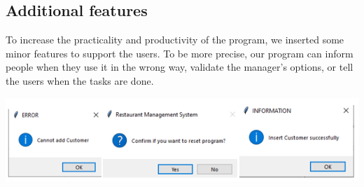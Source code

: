 \subsection{Additional features}
\hspace{0.7cm} To increase the practicality and productivity of the program, we inserted some minor features to support the users. To be more precise, our program can inform people when they use it in the wrong way, validate the manager’s options, or tell the users when the tasks are done.

\vspace{1cm}
\includegraphics{images/check box error.png}